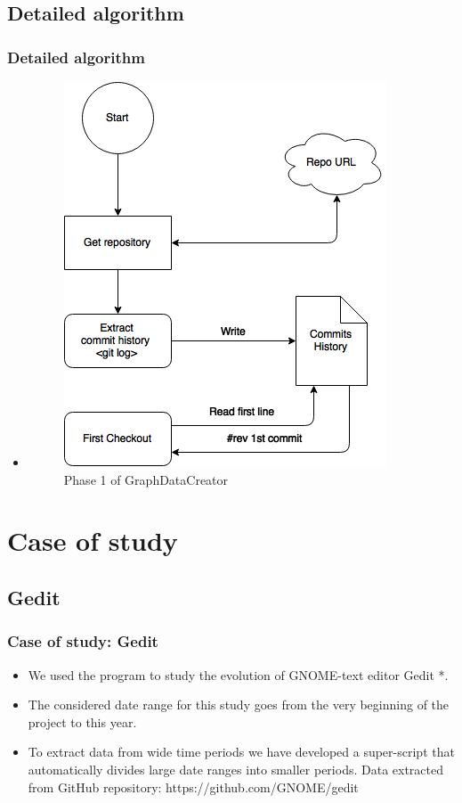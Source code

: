 \documentclass{beamer}
\begin{document}
\subsection{Detailed algorithm}

\begin{frame}
\frametitle{Detailed algorithm}
\begin{itemize}
\item <Several slides including graphic representations>
\begin{figure}
\begin{center}
\includegraphics[width=0.7\linewidth]{GDCphase1.png} 
\caption{Phase 1 of GraphDataCreator}
\label{fig:phase1}
\end{center}
\end{figure}
\end{itemize}
\end{frame}

\section{Case of study}
\subsection{Gedit}
\begin{frame}
\frametitle{Case of study: Gedit}
\begin{itemize}
\item We used the program to study the evolution of GNOME-text editor Gedit *.
\item The considered date range for this study goes from the very beginning of the project to this year.
\item To extract data from wide time periods we have developed a super-script that automatically divides large date ranges into smaller periods.
\text * Data extracted from GitHub repository: https://github.com/GNOME/gedit
\end{itemize}
\end{frame}
\end{document}
